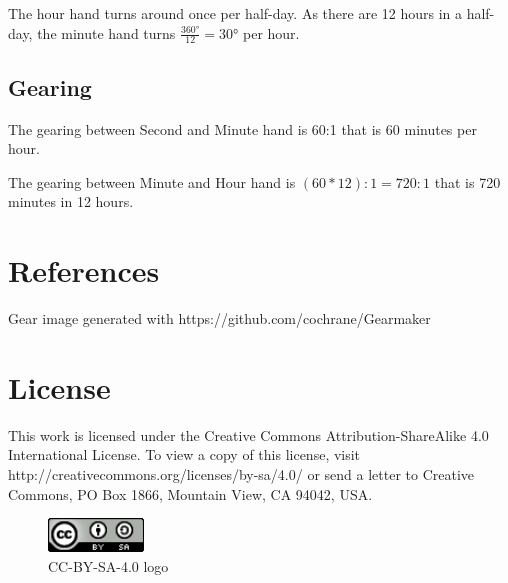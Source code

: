 \documentclass[11pt]{amsart}
\begin{document}
The hour hand turns around once per half-day. As there are 12 hours in a half-day, the minute hand turns
 \( \frac{ \ang{360} }{12} = \ang{30} \)  per hour. 
 
 \subsection{Gearing}
 
 The gearing between Second and Minute hand is 60:1 that is 60 minutes per hour.
 
 The gearing between Minute and Hour hand is \( (60*12):1 = 720:1 \) that is 720 minutes in 12 hours.

\section{References}
\printbibliography

Gear image generated with https://github.com/cochrane/Gearmaker

\section{License}
This work is licensed under the Creative Commons Attribution-ShareAlike 4.0 International License. To view a copy of this license, visit http://creativecommons.org/licenses/by-sa/4.0/ or send a letter to Creative Commons, PO Box 1866, Mountain View, CA 94042, USA.

\begin{figure}[h!]
  \caption{CC-BY-SA-4.0 logo}
  \centering
\includegraphics[width=1in]{by-sa-4.png}
\end{figure}
\end{document}
